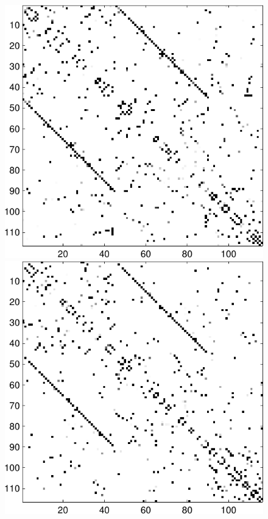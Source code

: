 \documentclass[a4paper, english]{article}
\begin{document}
\begin{figure}[h!]
\begin{minipage}[t]{1.2\textwidth}
  \includegraphics[height=0.29\textheight]{images/new/struct_subj3-crop}
  \includegraphics[height=0.29\textheight]{images/new/struct_subj4-crop}

\end{minipage}
\end{figure}
\end{document}
